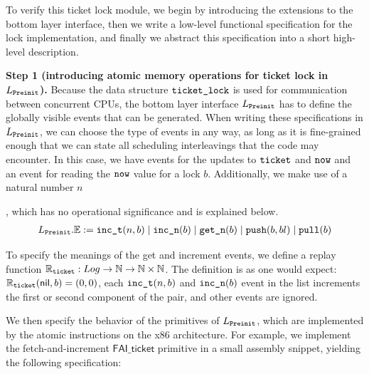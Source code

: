 {To verify this ticket lock module,
we begin by 
introducing the extensions to the bottom layer interface,
then we write a
low-level functional specification for the lock implementation,
and finally we abstract this specification into a short
high-level description.


\noindent\textbf{Step 1 (introducing atomic memory operations for ticket lock in $L_\code{Preinit}$).}
Because the data structure $\comm{ticket\_lock}$ is used for communication
between concurrent CPUs, 
the bottom layer interface $L_\code{Preinit}$
has to define the globally visible events that can be generated. 
When writing these specifications in $L_\code{Preinit}$,  we can choose the type of events in any way, as long
as it is 
fine-grained enough that we can state all scheduling interleavings that
the code may encounter. In this case, we have events for the updates to
$\ticket$ and $\now$ and an event for reading the $\now$ value
for a lock $b$. Additionally, we make use of a natural number 
$n$, which has no
operational significance and is explained below.
\[
\begin{array}{c}
L_\code{Preinit}.\Ev := \incticket(n, b) \mid \incnow(b) \mid \getnow(b)
\mid \push(b,bl) \mid \pull(b)
\ignore{\\
&  \mid &  \holdlock \mid \tshared (e : \mathsf{SharedMemEvent})}
\end{array}
\]%

To specify the meanings of the get and increment events, we define a replay
function $\replay_{\comm{ticket}} : Log \to \integer \to \integer\times \integer$. 
The definition is as one would expect:
$\replay_{\comm{ticket}}(\mathsf{nil}, b) = (0,0)$, each 
$\incticket(n, b)$ and $\incnow(b)$ event in the list increments
the first or second component of the pair, and other events are ignored.

We then specify the behavior of the primitives
of $L_\code{Preinit}$, which are implemented by the atomic instructions on the x86 architecture. 
For example, we implement the
fetch-and-increment $\mathsf{FAI\_ticket}$ primitive in a small 
assembly snippet, yielding the following specification:
\begin{mathpar}
\end{mathpar}%

}
